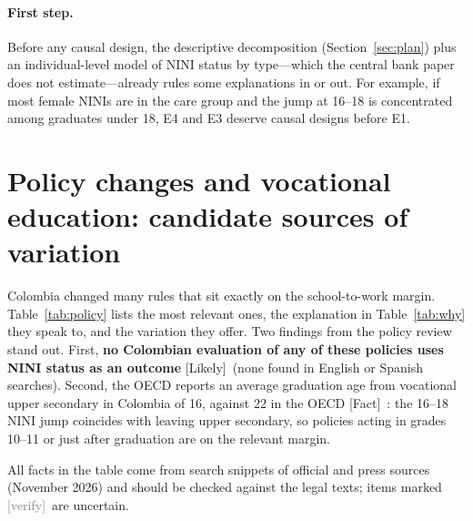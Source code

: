 \documentclass[11pt]{article}
\newcommand{\fact}{\textcolor{green!45!black}{\textsf{\footnotesize[Fact]}}}
\newcommand{\likely}{\textcolor{orange!80!black}{\textsf{\footnotesize[Likely]}}}
\newcommand{\verify}{\textcolor{gray}{\textsf{\footnotesize[verify]}}}
\begin{document}
\paragraph{First step.} Before any causal design, the descriptive decomposition (Section~\ref{sec:plan}) plus an individual-level model of NINI status by type---which the central bank paper does not estimate---already rules some explanations in or out. For example, if most female NINIs are in the care group and the jump at 16--18 is concentrated among graduates under 18, E4 and E3 deserve causal designs before E1.

\section{Policy changes and vocational education: candidate sources of variation}\label{sec:policy}

Colombia changed many rules that sit exactly on the school-to-work margin. Table~\ref{tab:policy} lists the most relevant ones, the explanation in Table~\ref{tab:why} they speak to, and the variation they offer. Two findings from the policy review stand out. First, \textbf{no Colombian evaluation of any of these policies uses NINI status as an outcome} \likely\ (none found in English or Spanish searches). Second, the OECD reports an average graduation age from vocational upper secondary in Colombia of 16, against 22 in the OECD \fact\ \citep{oecd2022vet}: the 16--18 NINI jump coincides with leaving upper secondary, so policies acting in grades 10--11 or just after graduation are on the relevant margin.

All facts in the table come from search snippets of official and press sources (November 2026) and should be checked against the legal texts; items marked \verify\ are uncertain.
\end{document}
